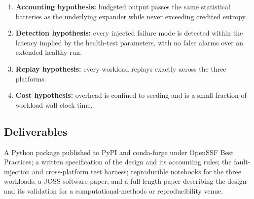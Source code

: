 \begin{enumerate}
  \item \textbf{Accounting hypothesis:} budgeted output passes the same statistical
        batteries as the underlying expander while never exceeding credited entropy.
  \item \textbf{Detection hypothesis:} every injected failure mode is detected within
        the latency implied by the health-test parameters, with no false alarms over an
        extended healthy run.
  \item \textbf{Replay hypothesis:} every workload replays exactly across the three
        platforms.
  \item \textbf{Cost hypothesis:} overhead is confined to seeding and is a small fraction
        of workload wall-clock time.
\end{enumerate}
 
\subsection{Deliverables}
 
A Python package published to PyPI and conda-forge under OpenSSF Best Practices; a
written specification of the design and its accounting rules; the fault-injection and
cross-platform test harness; reproducible notebooks for the three workloads; a JOSS
software paper; and a full-length paper describing the design and its validation for a
computational-methods or reproducibility venue.